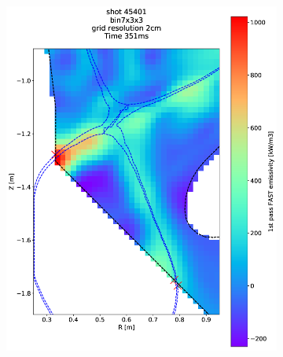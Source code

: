 \begin{figure}
     \centering
     \begin{subfigure}{0.21\textwidth}
         \centering
         \includegraphics[trim={0 0 25 0},clip,width=\textwidth]{Chapters/chapter2/figs/45401_1.png}
         \label{fig:45401_1}
     \end{subfigure}
     \hfill
     \begin{subfigure}{0.2\textwidth}
         \centering

\end{subfigure}
\end{figure}
